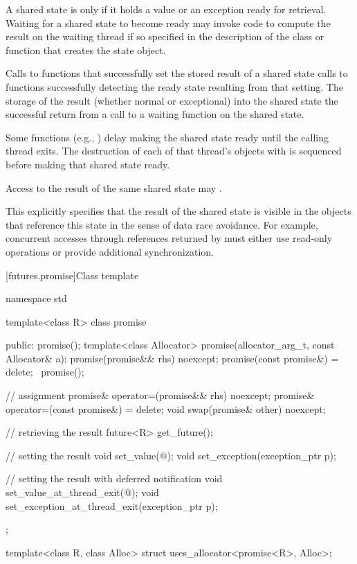 \pnum
A shared state is  only if it holds a value or an exception ready for
retrieval.
Waiting for a shared state to become ready may invoke code to compute the result on
the waiting thread if so specified in the description of the class or function that creates
the state object.

\pnum
Calls to functions that successfully set the stored result of a shared
state  calls to functions
successfully detecting the ready state resulting from that setting.
The storage of the result
(whether normal or exceptional) into the shared state
the successful return from a call to a waiting function on the shared state.

\pnum
Some functions (e.g., ) delay making
the shared state ready until the calling thread exits. The destruction of
each of that thread's objects with 
is sequenced before making that shared state ready.

\pnum
Access to the result of the same shared state may .
\begin{note}
This explicitly specifies that the result of the shared state is
visible in the objects that reference this state in the sense of data race
avoidance. For example, concurrent accesses through
references returned by 
must either use read-only operations or provide additional synchronization.
\end{note}

[futures.promise]{Class template }

%
\begin{codeblock}
namespace std {
  template<class R>
  class promise {
  public:
    promise();
    template<class Allocator>
      promise(allocator_arg_t, const Allocator& a);
    promise(promise&& rhs) noexcept;
    promise(const promise&) = delete;
    ~promise();

    // assignment
    promise& operator=(promise&& rhs) noexcept;
    promise& operator=(const promise&) = delete;
    void swap(promise& other) noexcept;

    // retrieving the result
    future<R> get_future();

    // setting the result
    void set_value(@\seebelow@);
    void set_exception(exception_ptr p);

    // setting the result with deferred notification
    void set_value_at_thread_exit(@\seebelow@);
    void set_exception_at_thread_exit(exception_ptr p);
  };

  template<class R, class Alloc>
    struct uses_allocator<promise<R>, Alloc>;
}
\end{codeblock}

